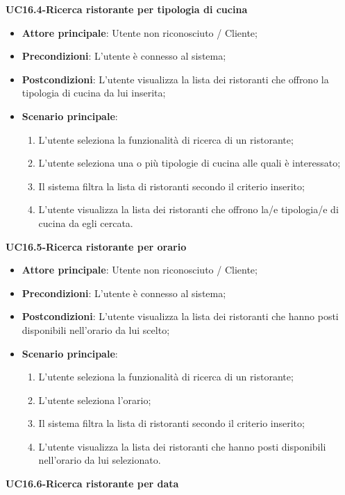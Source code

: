 \textbf{UC16.4-Ricerca ristorante per tipologia di cucina}

\begin{itemize}
\item \textbf{Attore principale}: Utente non riconosciuto / Cliente;
\item \textbf{Precondizioni}: L'utente è connesso al sistema;
\item \textbf{Postcondizioni}: L'utente visualizza la lista dei ristoranti che offrono la tipologia di cucina da lui inserita;
\item \textbf{Scenario principale}:
\begin{enumerate}
\item L'utente seleziona la funzionalità di ricerca di un ristorante;
\item L'utente seleziona una o più tipologie di cucina alle quali è interessato;
\item Il sistema filtra la lista di ristoranti secondo il criterio inserito;
\item L'utente visualizza la lista dei ristoranti che offrono la/e tipologia/e di cucina da egli cercata.
\end{enumerate}
\end{itemize}

\textbf{UC16.5-Ricerca ristorante per orario}

\begin{itemize}
\item \textbf{Attore principale}: Utente non riconosciuto / Cliente;
\item \textbf{Precondizioni}: L'utente è connesso al sistema;
\item \textbf{Postcondizioni}: L'utente visualizza la lista dei ristoranti che hanno posti disponibili nell'orario da lui scelto;
\item \textbf{Scenario principale}:
\begin{enumerate}
\item L'utente seleziona la funzionalità di ricerca di un ristorante;
\item L'utente seleziona l'orario;
\item Il sistema filtra la lista di ristoranti secondo il criterio inserito;
\item L'utente visualizza la lista dei ristoranti che hanno posti disponibili nell'orario da lui selezionato.
\end{enumerate}
\end{itemize}

\textbf{UC16.6-Ricerca ristorante per data}

